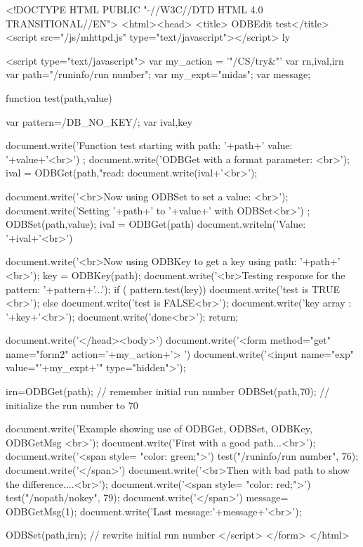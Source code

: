 \begin{DoxyCode}
<!DOCTYPE HTML PUBLIC "-//W3C//DTD HTML 4.0 TRANSITIONAL//EN">
<html><head>
<title> ODBEdit test</title>
\htmlonly <script src="/js/mhttpd.js" type="text/javascript"></script> \endhtmlon
      ly

\htmlonly <script type="text/javascript">
var my_action = '"/CS/try&"'
var rn,ival,irn
var path="/runinfo/run number";
var my_expt="midas";
var message;

function test(path,value)
{
var pattern=/DB_NO_KEY/;
var ival,key

document.write('Function test starting with path: '+path+' value: '+value+'<br>')
      ;
document.write('ODBGet with a format parameter:  <br>');
ival = ODBGet(path,"read:%
document.write(ival+'<br>');

document.write('<br>Now using ODBSet to set a value: <br>');
document.write('Setting '+path+' to '+value+' with ODBSet<br>') ;
ODBSet(path,value);
ival = ODBGet(path)
document.writeln('Value: '+ival+'<br>')

document.write('<br>Now using ODBKey to get a key using path: '+path+' <br>');
key = ODBKey(path);
document.write('<br>Testing response for the pattern: '+pattern+'...');
 if ( pattern.test(key))
      document.write('test is TRUE <br>');
 else
      document.write('test is FALSE<br>');
document.write('key array : '+key+'<br>');
document.write('done<br>');
return;
}


document.write('</head><body>')
document.write('<form method="get" name="form2" action='+my_action+'> ')
document.write('<input name="exp" value="'+my_expt+'" type="hidden">');

irn=ODBGet(path); // remember initial run number
ODBSet(path,70); // initialize the run number to 70

document.write('Example showing use of ODBGet, ODBSet, ODBKey, ODBGetMsg <br>');
document.write('First with a good path...<br>');
document.write('<span style= "color: green;">')
test("/runinfo/run number", 76);
document.write('</span>')
document.write('<br>Then with bad path to show the difference....<br>');
document.write('<span style= "color: red;">')
test("/nopath/nokey", 79);
document.write('</span>')
message= ODBGetMsg(1);
document.write('Last message:'+message+'<br>');

ODBSet(path,irn); // rewrite initial run number
</script> \endhtmlonly
</form>
</html>
\end{DoxyCode}


